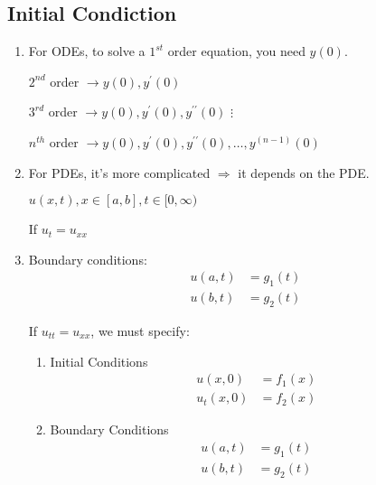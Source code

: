 \subsection{Initial Condiction}

\begin{enumerate}
  \item For ODEs, to solve a
  $1^{st}$ order equation, you need $y(0)$.

  $2^{nd}$ order $\rightarrow y(0), y^\prime(0)$

  $3^{rd}$ order $\rightarrow y(0), y^\prime(0), y^{\prime\prime}(0)$
  $\vdots$

  $n^{th}$ order $\rightarrow y(0), y^\prime(0), y^{\prime\prime}(0), \ldots, y^{(n - 1)}(0)$
  \item For PDEs, it's more complicated $\Rightarrow$ it depends on the PDE.

  \Ex $u(x, t), x \in [a, b], t \in [0, \infty)$

  If $u_t = u_{xx}$
  \item Boundary conditions:
  \begin{align}
    u(a, t) & = g_1(t)\\
    u(b, t) & = g_2(t)
  \end{align}

  If $u_{tt} = u_{xx}$, we must specify:
  \begin{enumerate}
    \item Initial Conditions
    \begin{align}
      u(x, 0) & = f_1(x)\\
      u_t(x, 0) & = f_2(x)
    \end{align}
    \item Boundary Conditions
    \begin{align}
      u(a, t) & = g_1(t)\\
      u(b, t) & = g_2(t)
    \end{align}
  \end{enumerate}
\end{enumerate}

